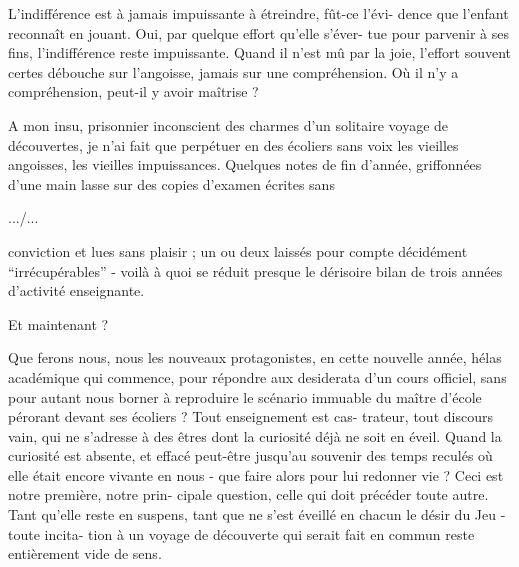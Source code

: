 \documentclass[11pt]{article}
\newcommand{\scanpage}[1]{\par\bigskip\noindent{\small\sffamily[scan #1]}\par}
\newcommand{\mspage}[1]{{\small\sffamily[p.\,#1]}}
\newcommand{\hand}[1]{\textcolor{blue}{#1}}
\begin{document}
L'indifférence est à jamais impuissante à étreindre, fût-ce l'évi-%
dence que l'enfant reconnaît en jouant. Oui, par quelque effort qu'elle s'éver-%
tue pour parvenir à ses fins, l'indifférence reste impuissante. Quand il n'est
mû par la joie, l'effort souvent certes débouche sur l'angoisse, jamais sur
une compréhension. Où il n'y a compréhension, peut-il y avoir maîtrise ?

A mon insu, prisonnier inconscient des charmes d'un solitaire
voyage de découvertes, je n'ai fait que perpétuer en des écoliers sans voix
les vieilles angoisses, les vieilles impuissances. Quelques notes de fin
d'année, griffonnées d'une main lasse sur des copies d'examen écrites sans

\hfill .../...

\mspage{\hand{193}}

\clearpage
\scanpage{119/194}
\mspage{- 2 -}

conviction et lues sans plaisir ; un ou  deux laissés pour compte décidément
``irrécupérables'' - voilà à quoi se réduit presque le dérisoire bilan de
trois années d'activité enseignante.

Et maintenant ?

Que ferons nous, nous les nouveaux protagonistes, en cette nouvelle
année, hélas académique qui commence, pour répondre aux desiderata d'un cours
officiel, sans pour autant nous borner à reproduire le scénario immuable
du maître d'école pérorant devant ses écoliers ? Tout enseignement est cas-%
trateur, tout discours vain, qui ne s'adresse à des êtres dont la curiosité
déjà ne soit en éveil. Quand la curiosité est absente, et effacé peut-être
jusqu'au souvenir des temps reculés où elle était encore vivante en nous -
que faire alors pour lui redonner vie ? Ceci est notre première, notre prin-%
cipale question, celle qui doit précéder toute autre. Tant qu'elle reste en
suspens, tant que ne s'est éveillé en chacun le désir du Jeu - toute incita-%
tion à un voyage de découverte qui serait fait en commun reste entièrement
vide de sens.
\end{document}
